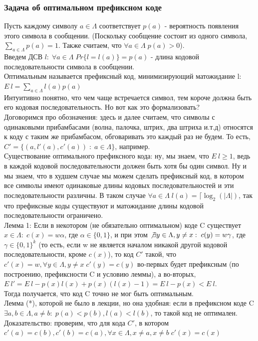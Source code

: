\subsubsection{Задача об оптимальном префиксном коде}
Пусть каждому символу $a \in \Lambda$ соответствует $p(a)$ - вероятность появления этого символа в сообщении. (Поскольку сообщение состоит из одного символа, $\sum\limits_{a \in \Lambda}p(a) = 1$. Также считаем, что $\forall a \in \Lambda \; p(a) > 0$).\\
Введем ДСВ $l: \; \forall a \in \Lambda \; Pr\{l = l(a)\} = p(a)$ - длина кодовой последовательности символа в сообщении.\\
Оптимальным называется префиксный код, минимизирующий матожидание l: $E \: l = \sum\limits_{a \in \Lambda}l(a)p(a)$\\
Интуитивно понятно, что чем чаще встречается символ, тем короче должна быть его кодовая последовательность. Но вот как это формализовать?\\
Договоримся про обозначения: здесь и далее считаем, что символы с одинаковыми прибамбасами (волна, палочка, штрих, два штриха и.т.д) относятся к коду с таким же прибамбасом, обговаривать это каждый раз не будем. То есть, $C' = \{(a, l'(a), c'(a)) \; : \; a \in \Lambda\}$, например.\\
Существование оптимального префиксного кода: ну, мы знаем, что $E \: l \geq 1$, ведь в каждой кодовой последовательности должен быть хотя бы один символ. Ну и мы знаем, что в худшем случае мы можем сделать префиксный код, в котором все символы имеют одинаковые длины кодовых последовательностей и эти последовательности различны. В таком случае $\forall a \in \Lambda \; l(a) = \lceil \log_2(|\Lambda|)$, так что префиксные коды существуют и матожидание длины кодовой последовательности ограничено.\\
Лемма 1: Если в некотором (не обязательно оптимальном) коде C существует $x \in \Lambda: \; c(x) = w\alpha$, где $\alpha \in \{0, 1\}$, и при этом $\not\exists y \in \Lambda, y \not= x: \; c(y) = w\gamma$, где $\gamma \in \{0, 1\}^k$ (то есть, если w не является началом никакой другой кодовой последовательности, кроме $c(x)$), то код $C'$ такой, что $c'(x) = w, \forall y \in \Lambda, y \not= x \; c'(y) = c(y)$ во-первых будет префиксным (по построению, префиксности C и условию леммы), а во-вторых, $E \: l' = E \: l - p(x)l(x) + p(x)(l(x) - 1) = E \: l - p(x) < E \: l$.\\
Тогда получается, что код C точно не мог быть оптимальным.\\
Лемма (*), которой не было в лекции, но она удобная: если в префиксном коде C $\exists a, b \in \Lambda, a \not= b: \;p(a) < p(b), l(a) < l(b)$, то такой код не оптимален. Доказательство: проверим, что для кода $C'$, в котором $c'(a) = c(b), c'(b) = c(a), \forall x \in \Lambda, x \not= a, x \not= b \; c'(x) = c(x)$\\
